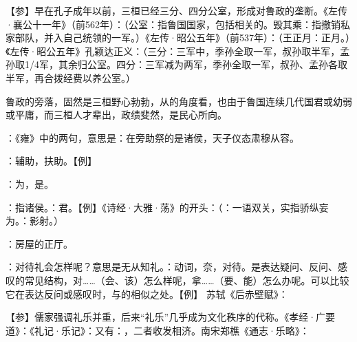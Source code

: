{
【参】早在孔子成年以前，三桓已经三分、四分公室，形成对鲁政的垄断。《左传·襄公十一年》（前562年）：（公室：指鲁国国家，包括相关的。毁其乘：指撤销私家部队，并入自己统领的一军。）《左传·昭公五年》（前537年）：（王正月：正月。）《左传·昭公五年》孔颖达正义：（三分：三军中，季孙全取一军，叔孙取半军，孟孙取1/4军，其余归公室。四分：三军减为两军，季孙全取一军，叔孙、孟孙各取半军，再合拨经费以养公室。）

鲁政的旁落，固然是三桓野心勃勃，从的角度看，也由于鲁国连续几代国君或幼弱或平庸，而三桓人才辈出，政绩斐然，是民心所向。

\item {}：《雍》中的两句，意思是：在旁助祭的是诸侯，天子仪态肃穆从容。

：辅助，扶助。【例】 

：为，是。

：指诸侯。：君。【例】《诗经·大雅·荡》的开头：（：一语双关，实指骄纵妄为。：影射。）

\item {}：房屋的正厅。%
}
{}


{
\item {}：对待礼会怎样呢？意思是无从知礼。：动词，奈，对待。是表达疑问、反问、感叹的常见结构，对……（会、该）怎么样呢，拿……（要、能）怎么办呢。可以比较它在表达反问或感叹时，与的相似之处。【例】 苏轼《后赤壁赋》：

【参】儒家强调礼乐并重，后来“礼乐”几乎成为文化秩序的代称。《孝经·广要道》：《礼记·乐记》：又有：，二者收发相济。南宋郑樵《通志·乐略》：
}
{}


